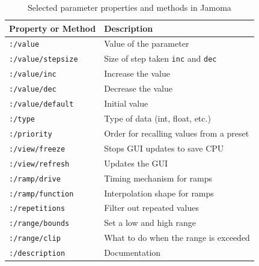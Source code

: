 \documentclass{article}
\begin{document}
\begin{table}[ht]
\begin{center}
\footnotesize\noindent
\begin{tabular}{| l | p{4.5cm} |}
    \hline
    \textbf{Property or Method}          & \textbf{Description}\\ 
	\hline
	\texttt{:/value}			& Value of the parameter \\
	\hline
	\texttt{:/value/stepsize}	& Size of step taken \texttt{inc} and \texttt{dec} \\
	\hline
	\texttt{:/value/inc}		& Increase the value \\
	\hline
	\texttt{:/value/dec}		& Decrease the value \\
	\hline
	\texttt{:/value/default}	& Initial value \\
	\hline
	\texttt{:/type} 			& Type of data (int, float, etc.) \\
	\hline
	\texttt{:/priority} 		& Order for recalling values from a preset \\
	\hline
	\texttt{:/view/freeze} 		& Stops GUI updates to save CPU \\
	\hline
	\texttt{:/view/refresh} 		& Updates the GUI \\
	\hline
	\texttt{:/ramp/drive} 		& Timing mechanism for ramps \\
	\hline
	\texttt{:/ramp/function} 	& Interpolation shape for ramps \\
	\hline
	\texttt{:/repetitions} 		& Filter out repeated values \\
	\hline
	\texttt{:/range/bounds} 	& Set a low and high range \\
	\hline
	\texttt{:/range/clip} 		& What to do when the range is exceeded \\
	\hline
	\texttt{:/description} 		& Documentation \\
	\hline
\end{tabular}
\end{center}
\caption{Selected parameter properties and methods in Jamoma}
\label{tab:parameter_properties}
\end{table}
\end{document}
